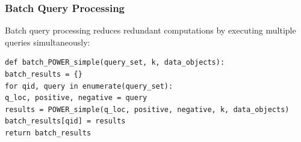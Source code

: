 \documentclass[]{IEEEphot}
\begin{document}
\subsubsection*{Batch Query Processing}
Batch query processing reduces redundant computations by executing multiple queries simultaneously:

\begin{verbatim}
def batch_POWER_simple(query_set, k, data_objects):
batch_results = {}
for qid, query in enumerate(query_set):
q_loc, positive, negative = query
results = POWER_simple(q_loc, positive, negative, k, data_objects)
batch_results[qid] = results
return batch_results
\end{verbatim}
\end{document}
